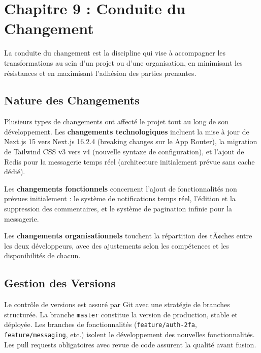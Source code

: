 
\section{Chapitre 9 : Conduite du Changement}



La conduite du changement est la discipline qui vise à accompagner les transformations au sein d'un projet ou d'une organisation, en minimisant les résistances et en maximisant l'adhésion des parties prenantes.



\subsection{Nature des Changements}



Plusieurs types de changements ont affecté le projet tout au long de son développement. Les \textbf{changements technologiques} incluent la mise à jour de Next.js 15 vers Next.js 16.2.4 (breaking changes sur le App Router), la migration de Tailwind CSS v3 vers v4 (nouvelle syntaxe de configuration), et l'ajout de Redis pour la messagerie temps réel (architecture initialement prévue sans cache dédié).



Les \textbf{changements fonctionnels} concernent l'ajout de fonctionnalités non prévues initialement : le système de notifications temps réel, l'édition et la suppression des commentaires, et le système de pagination infinie pour la messagerie.



Les \textbf{changements organisationnels} touchent la répartition des tÃ¢ches entre les deux développeurs, avec des ajustements selon les compétences et les disponibilités de chacun.



\subsection{Gestion des Versions}



Le contrôle de versions est assuré par Git avec une stratégie de branches structurée. La branche \texttt{master} constitue la version de production, stable et déployée. Les branches de fonctionnalités (\texttt{feature/auth-2fa}, \texttt{feature/messaging}, etc.) isolent le développement des nouvelles fonctionnalités. Les pull requests obligatoires avec revue de code assurent la qualité avant fusion.



